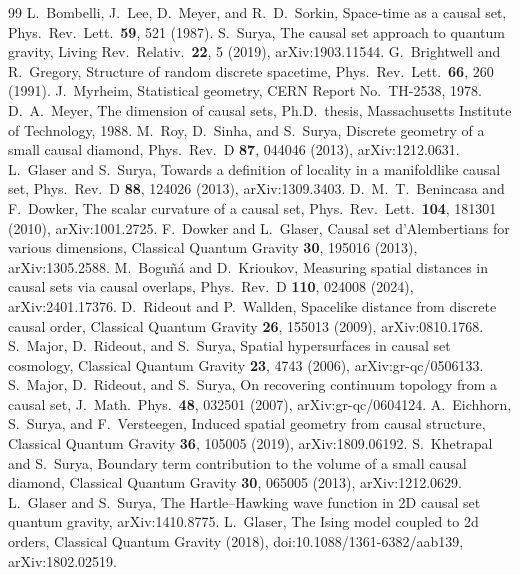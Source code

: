 \documentclass[prd,twocolumn,superscriptaddress,nofootinbib,amsmath,amssymb,floatfix]{revtex4-2}
\begin{document}
\begin{thebibliography}{99}
 L.~Bombelli, J.~Lee, D.~Meyer, and R.~D.~Sorkin, Space-time as a causal set, Phys.\ Rev.\ Lett.\ \textbf{59}, 521 (1987).
 S.~Surya, The causal set approach to quantum gravity, Living Rev.\ Relativ.\ \textbf{22}, 5 (2019), arXiv:1903.11544.
 G.~Brightwell and R.~Gregory, Structure of random discrete spacetime, Phys.\ Rev.\ Lett.\ \textbf{66}, 260 (1991).
 J.~Myrheim, Statistical geometry, CERN Report No.\ TH-2538, 1978.
 D.~A.~Meyer, The dimension of causal sets, Ph.D.\ thesis, Massachusetts Institute of Technology, 1988.
 M.~Roy, D.~Sinha, and S.~Surya, Discrete geometry of a small causal diamond, Phys.\ Rev.\ D \textbf{87}, 044046 (2013), arXiv:1212.0631.
 L.~Glaser and S.~Surya, Towards a definition of locality in a manifoldlike causal set, Phys.\ Rev.\ D \textbf{88}, 124026 (2013), arXiv:1309.3403.
 D.~M.~T.~Benincasa and F.~Dowker, The scalar curvature of a causal set, Phys.\ Rev.\ Lett.\ \textbf{104}, 181301 (2010), arXiv:1001.2725.
 F.~Dowker and L.~Glaser, Causal set d'Alembertians for various dimensions, Classical Quantum Gravity \textbf{30}, 195016 (2013), arXiv:1305.2588.
 M.~Bogu\~n\'a and D.~Krioukov, Measuring spatial distances in causal sets via causal overlaps, Phys.\ Rev.\ D \textbf{110}, 024008 (2024), arXiv:2401.17376.
 D.~Rideout and P.~Wallden, Spacelike distance from discrete causal order, Classical Quantum Gravity \textbf{26}, 155013 (2009), arXiv:0810.1768.
 S.~Major, D.~Rideout, and S.~Surya, Spatial hypersurfaces in causal set cosmology, Classical Quantum Gravity \textbf{23}, 4743 (2006), arXiv:gr-qc/0506133.
 S.~Major, D.~Rideout, and S.~Surya, On recovering continuum topology from a causal set, J.\ Math.\ Phys.\ \textbf{48}, 032501 (2007), arXiv:gr-qc/0604124.
 A.~Eichhorn, S.~Surya, and F.~Versteegen, Induced spatial geometry from causal structure, Classical Quantum Gravity \textbf{36}, 105005 (2019), arXiv:1809.06192.
 S.~Khetrapal and S.~Surya, Boundary term contribution to the volume of a small causal diamond, Classical Quantum Gravity \textbf{30}, 065005 (2013), arXiv:1212.0629.
 L.~Glaser and S.~Surya, The Hartle--Hawking wave function in 2D causal set quantum gravity, arXiv:1410.8775.
 L.~Glaser, The Ising model coupled to 2d orders, Classical Quantum Gravity (2018), doi:10.1088/1361-6382/aab139, arXiv:1802.02519.

\end{thebibliography}
\end{document}
